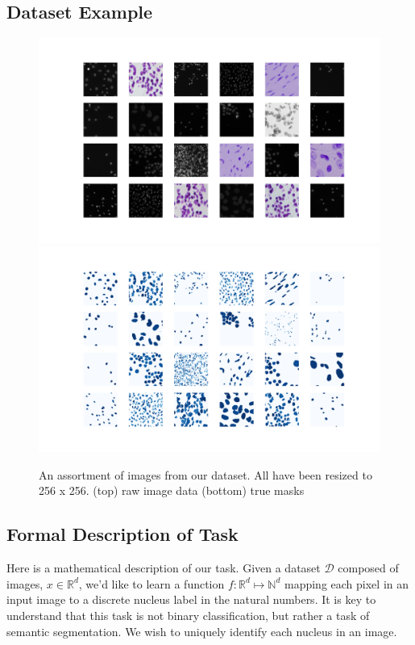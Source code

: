 \documentclass[paper=letter, fontsize=12pt]{article}
\numberwithin{equation}{section} %
\numberwithin{figure}{section} %
\numberwithin{table}{section} %
\begin{document}
\begin{appendixatend}
    \subsection{Dataset Example}
    \begin{figure}
        \centering
        \includegraphics[width=\textwidth]{./figs/dsbowl18-imagegrid-4x6.png}
        \includegraphics[width=\textwidth]{./figs/dsbowl18-imagegrid-masks-4x6.png}
        \caption{An assortment of images from our dataset.  All have been resized
        to 256 x 256. (top) raw image data (bottom) true masks }
        \label{fig:dsbowl18-grid}
    \end{figure}
\end{appendixatend}

\subsection{Formal Description of Task}

Here is a mathematical description of our task.  Given a dataset $\mathcal{D}$
composed of images, $x \in \mathbb{R}^{d}$, we'd like to learn a function $f :
\mathbb{R}^{d} \mapsto \mathbb{N}^{d}$ mapping each pixel in an input image to
a discrete nucleus label in the natural numbers.  It is key to understand that
this task is not binary classification, but rather a task of semantic
segmentation.  We wish to uniquely identify each nucleus in an image.
\end{document}
